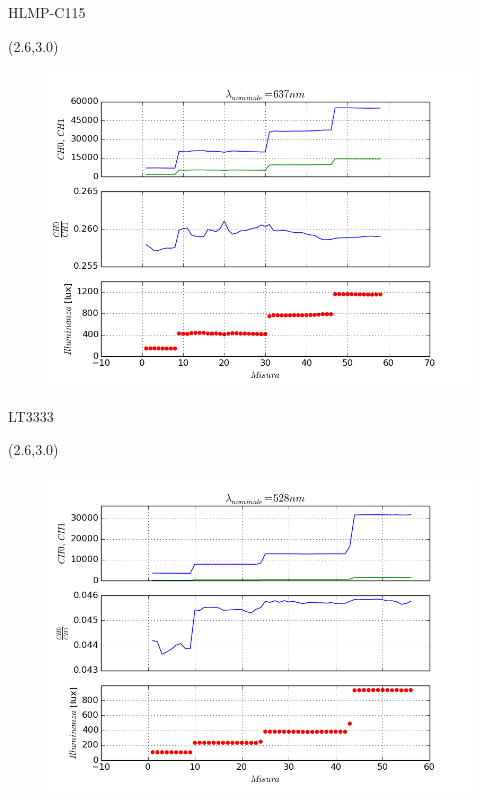 \documentclass{beamer}
\begin{document}
\begin{frame}{HLMP-C115}
\begin{textblock}{9}(2.6,3.0)
\begin{figure}
\includegraphics[scale=.42]{triple_rosso}
\end{figure}
\end{textblock}
\end{frame}

\begin{frame}{LT3333}
\begin{textblock}{9}(2.6,3.0)
\begin{figure}
\includegraphics[scale=.42]{triple_verde}
\end{figure}
\end{textblock}
\end{frame}
\end{document}
